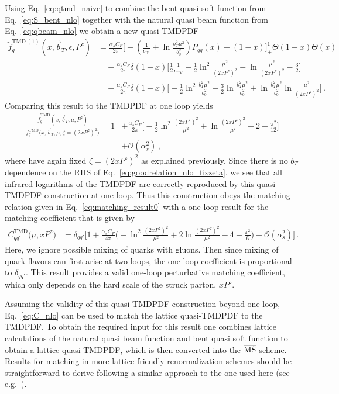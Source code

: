 \documentclass[11pt,a4paper]{article}
\DeclareRobustCommand{\eq}[1]{Eq.~\eqref{eq:#1}}
\newcommand{\eps}{\epsilon}
\newcommand{\cO}{\mathcal{O}}
\newcommand{\nn}{\nonumber}
\newcommand{\as}{\alpha_s}
\newcommand{\UV}{\mathrm{UV}}
\newcommand{\IR}{\mathrm{IR}}
\newcommand\TMD{\mathrm{TMD}}
\newcommand{\Lb}[1]{\ln^{#1}\frac{b_T^2 \mu^2}{b_0^2}}
\newcommand{\bt}{\vec b_T}
\begin{document}
Using \eq{qtmd_naive} to combine the bent quasi soft function from \eq{S_bent_nlo} together with the natural quasi beam function from \eq{qbeam_nlo} we obtain a new quasi-TMDPDF
\begin{align} \label{eq:qtmd_nloxP_bent}
 \tilde f_{q}^{\TMD\,(1)}(x,\bt,\eps,P^z)&
 = \frac{\as C_F}{2\pi} \biggl[ - \left(\frac{1}{\eps_\IR} + \Lb{} \right) P_{qq}(x)
   +  (1-x) \biggr]_+^1 \Theta(1-x)\Theta(x)
 \nn\\&\quad
 + \frac{\as C_F}{2\pi} \delta(1-x) \biggl[ \frac{1}{2} \frac{1}{\eps_\UV}
   - \frac{1}{2} \ln^2\frac{\mu^2}{(2xP^z)^2} - \ln\frac{\mu^2}{(2xP^z)^2} - \frac{3}{2} \biggr]
 \nn\\&\quad
 + \frac{\as C_F}{2\pi} \delta(1-x) \biggl[
  - \frac{1}{2} \Lb{2} + \frac{3}{2} \Lb{} + \Lb{} \ln\frac{\mu^2}{(2xP^z)^2}
   \biggr]
\,.\end{align}
Comparing this result to the TMDPDF at one loop yields
\begin{align} \label{eq:goodrelation_nlo_fixzeta}
 \frac{\tilde f_{q}^{\TMD}(x, \bt, \mu, P^z)}{f_{q}^{\TMD}\big(x, \bt, \mu, \zeta\!=\!(2xP^z)^2\big)}
 = 1 &+ \frac{\as C_F}{2\pi} \biggl[
   - \frac{1}{2} \ln^2\frac{(2xP^z)^2}{\mu^2}  + \ln\frac{(2xP^z)^2}{\mu^2}
   - 2 + \frac{\pi^2}{12}
   \biggr] 
  \nn \\
   &+ \cO(\as^2)
   \,,
\end{align}
where have again fixed $\zeta=(2xP^z)^2$ as explained previously.
Since there is no $b_T$ dependence on the RHS of \eq{goodrelation_nlo_fixzeta}, we see that all infrared logarithms of the TMDPDF are correctly reproduced by this quasi-TMDPDF construction at one loop. Thus this construction obeys the matching relation given in \eq{matching_result0} with a one loop result for the matching coefficient that is given by 
\begin{align} \label{eq:C_nlo}
 C_{qq'}^\TMD\bigl(\mu, x P^z\bigr) &
 = \delta_{q q'} \biggl[1 + \frac{\as C_F}{4\pi} \biggl( - \ln^2\frac{(2 x P^z)^2}{\mu^2}
                       + 2 \ln\frac{(2 x P^z)^2}{\mu^2} -4 + \frac{\pi^2}{6} \biggr) + \cO(\as^2) \biggr]
\,.
\end{align}
Here, we ignore possible mixing of quarks with gluons. Then since mixing of quark flavors can first arise at two loops, the one-loop coefficient is proportional to $\delta_{qq'}$.
This result provides a valid one-loop perturbative matching coefficient, which only depends on the hard scale of the struck parton, $xP^z$. 

Assuming the validity of this quasi-TMDPDF construction beyond one loop, \eq{C_nlo} can be used to match the lattice quasi-TMDPDF to the TMDPDF. To obtain the required input for this result one combines lattice calculations of the natural quasi beam function and bent quasi soft function to obtain a lattice quasi-TMDPDF, which is then converted into the $\overline{\rm MS}$ scheme. Results for matching in more lattice friendly renormalization schemes should be straightforward to derive following a similar approach to the one used here (see e.g.~\cite{Constantinou:2017sej,Stewart:2017tvs}).
\end{document}
